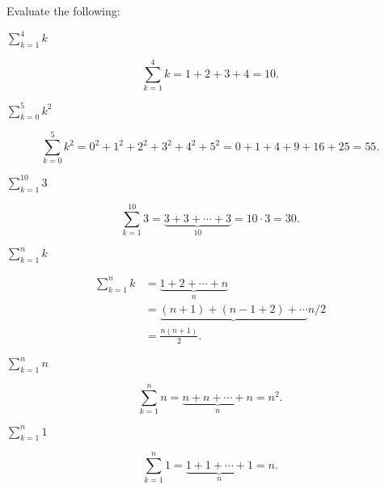 \documentclass[../key.tex]{subfiles}
\begin{document}
\begin{outer_problem}
\item Evaluate the following:
\end{outer_problem}

\begin{inner_problem}[start=1]
\item $\displaystyle\sum_{k=1}^4 k$
\end{inner_problem}

$$\displaystyle\sum_{k=1}^4 k = 1 + 2 + 3 + 4 = 10.$$

\begin{inner_problem}
\item $\displaystyle\sum_{k=0}^5 k^2$
\end{inner_problem}

$$\displaystyle\sum_{k=0}^5 k^2 = 0^2 + 1^2 + 2^2 + 3^2 + 4^2 + 5^2 = 0 + 1 + 4 + 9 + 16 + 25 = 55.$$

\begin{inner_problem}
\item $\displaystyle\sum_{k=1}^{10} 3$
\end{inner_problem}

$$\displaystyle\sum_{k=1}^{10} 3 = \underbrace{3 + 3 + \cdots + 3}_{10} = 10\cdot 3 = 30.$$

\begin{inner_problem}
\item $\displaystyle\sum_{k=1}^n k$
\end{inner_problem}

\begin{align*}
\sum_{k=1}^n k &= \underbrace{1 + 2 + \cdots + n}_{n} \\
&= \underbrace{(n+1) + (n-1+2) + \cdots}{n/2} \\
&= \frac{n(n+1)}{2}.
\end{align*}

\begin{inner_problem}
\item $\displaystyle\sum_{k=1}^n n$
\end{inner_problem}

$$\displaystyle\sum_{k=1}^n n = \underbrace{n + n + \cdots + n}_{n} = n^2.$$

\begin{inner_problem}
\item $\displaystyle\sum_{k=1}^n 1$
\end{inner_problem}

$$\displaystyle\sum_{k=1}^n 1 = \underbrace{1 + 1 + \cdots + 1}_{n} = n.$$
\end{document}
